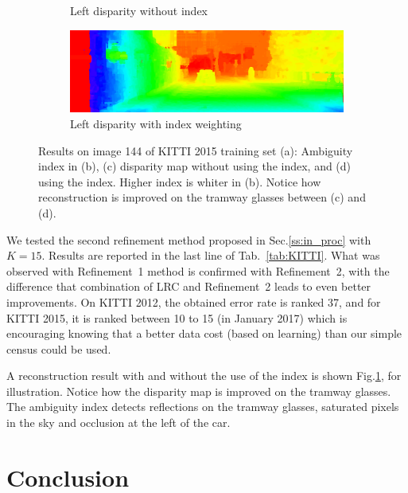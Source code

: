 \documentclass{article}
\begin{document}
\begin{figure}[ht]
\begin{subfigure}[t]{0.98\linewidth}
                \caption{Left disparity without index}
        \end{subfigure}        
        \begin{subfigure}[t]{0.98\linewidth}
                \includegraphics[width=0.99\linewidth]{Figures/144_10_df_}
                \caption{Left disparity with index weighting}
        \end{subfigure}        
        \caption{Results on image 144 of KITTI 2015 training set (a): Ambiguity index in (b), (c) disparity map without using the index, and (d) using the index. Higher index is whiter in (b).  Notice how reconstruction is improved on the tramway glasses between (c) and (d).}
        \label{fig:disp}
\end{figure}

We tested the second refinement method proposed in Sec.\ref{ss:in_proc} with $K=15$. Results are reported in the last line of Tab.~\ref{tab:KITTI}. What was observed with Refinement~1 method is confirmed with Refinement~2, with the difference that combination of LRC and Refinement~2 leads to even better improvements. On KITTI 2012, the obtained error rate is ranked 37, and for KITTI 2015, it is ranked between 10 to 15 (in January 2017) which is encouraging knowing that a better data cost (based on learning) than our simple census could be used.

A reconstruction result with and without the use of the index is shown Fig.\ref{fig:disp}, for illustration. Notice how the disparity map is improved on the tramway glasses. The ambiguity index detects reflections on the tramway glasses, saturated pixels in the sky and occlusion at the left of the car.

\section{Conclusion}
\label{sec:conclusion}
\end{document}
